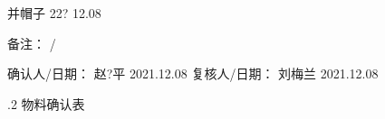 \documentclass[UTF8,10pt,a4paper,fontset=fandol]{ctexart}
\newcommand{\fieldvalue}[1]{#1}
\newcommand{\handwritten}[1]{#1}
\begin{document}
\handwritten{并帽子 22? 12.08}

\noindent 备注：
\handwritten{/}

\noindent
确认人/日期：
\fieldvalue{\handwritten{赵?平 2021.12.08}}
\hfill
复核人/日期：
\fieldvalue{\handwritten{刘梅兰 2021.12.08}}

\vspace{0.5em}
.2 物料确认表
\end{document}
